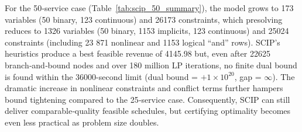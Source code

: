 \documentclass[Afour,sagev,times]{sagej}
\begin{document}
For the 50‐service case (Table~\ref{tab:scip_50_summary}), the model grows to 173 variables (50 binary, 123 continuous) and 26173 constraints, which presolving reduces to 1326 variables (50 binary, 1153 implicits, 123 continuous) and 25024 constraints (including 23 871 nonlinear and 1153 logical ``and'' rows). SCIP’s heuristics produce a best feasible revenue of 4145.98 but, even after 22625 branch‐and‐bound nodes and over 180 million LP iterations, no finite dual bound is found within the 36000-second limit (dual bound = \(+1\times10^{20}\), gap = $\infty$). The dramatic increase in nonlinear constraints and conflict terms further hampers bound tightening compared to the 25‐service case. Consequently, SCIP can still deliver comparable‐quality feasible schedules, but certifying optimality becomes even less practical as problem size doubles.
\end{document}

